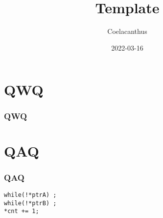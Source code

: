 \documentclass[UTF-8]{ctexbeamer}
\title{Template}
\author{Coelacanthus}
\date{2022-03-16}
\begin{document}
\begin{frame}
  \titlepage
\end{frame}

\section{QWQ}
\begin{frame}
\frametitle{QWQ}

\end{frame}


\section{QAQ}
\begin{frame}[fragile]
\frametitle{QAQ}

\begin{verbatim}
while(!*ptrA) ;
while(!*ptrB) ;
*cnt += 1;
\end{verbatim}
\end{frame}
\end{document}
